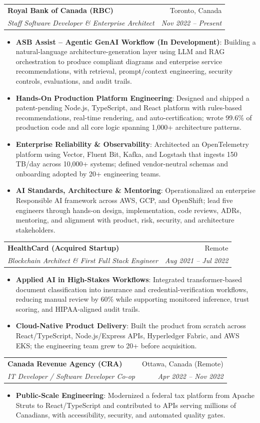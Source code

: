 \documentclass[letterpaper,9.5pt]{article}
\makeatletter
\newcommand{\resumeItem}[2]{\item\small{\textbf{#1}{: #2 \vspace{-2pt}}}}
\newcommand{\resumeSubheading}[4]{\vspace{-2pt}\item\begin{tabular*}{0.97\textwidth}{l@{\extracolsep{\fill}}r}\textbf{#1} & #2 \\\textit{\small#3} & \textit{\small #4} \\\end{tabular*}\vspace{-6pt}}
\newcommand{\resumeItemListStart}{\begin{itemize}}
\newcommand{\resumeItemListEnd}{\end{itemize}\vspace{-6pt}}
\makeatother
\begin{document}
  \resumeSubheading
    {Royal Bank of Canada (RBC)}{Toronto, Canada}
    {Staff Software Developer \& Enterprise Architect}{Nov 2022 -- Present}
  \resumeItemListStart
    \resumeItem{ASB Assist -- Agentic GenAI Workflow (In Development)}
      {Building a natural-language architecture-generation layer using LLM and RAG orchestration to produce compliant diagrams and enterprise service recommendations, with retrieval, prompt/context engineering, security controls, evaluations, and audit trails.}
    \resumeItem{Hands-On Production Platform Engineering}
      {Designed and shipped a patent-pending Node.js, TypeScript, and React platform with rules-based recommendations, real-time rendering, and auto-certification; wrote 99.6\% of production code and all core logic spanning 1,000+ architecture patterns.}
    \resumeItem{Enterprise Reliability \& Observability}
      {Architected an OpenTelemetry platform using Vector, Fluent Bit, Kafka, and Logstash that ingests 150\,TB/day across 10,000+ systems; defined vendor-neutral schemas and onboarding adopted by 20+ engineering teams.}
    \resumeItem{AI Standards, Architecture \& Mentoring}
      {Operationalized an enterprise Responsible AI framework across AWS, GCP, and OpenShift; lead five engineers through hands-on design, implementation, code reviews, ADRs, mentoring, and alignment with product, risk, security, and architecture stakeholders.}
  \resumeItemListEnd

  \resumeSubheading
    {HealthCard (Acquired Startup)}{Remote}
    {Blockchain Architect \& First Full Stack Engineer}{Aug 2021 -- Jul 2022}
  \resumeItemListStart
    \resumeItem{Applied AI in High-Stakes Workflows}
      {Integrated transformer-based document classification into insurance and credential-verification workflows, reducing manual review by 60\% while supporting monitored inference, trust scoring, and HIPAA-aligned audit trails.}
    \resumeItem{Cloud-Native Product Delivery}
      {Built the product from scratch across React/TypeScript, Node.js/Express APIs, Hyperledger Fabric, and AWS EKS; the engineering team grew to 20+ before acquisition.}
  \resumeItemListEnd

  \resumeSubheading
    {Canada Revenue Agency (CRA)}{Ottawa, Canada (Remote)}
    {IT Developer / Software Developer Co-op}{Apr 2022 -- Nov 2022}
  \resumeItemListStart
    \resumeItem{Public-Scale Engineering}
      {Modernized a federal tax platform from Apache Struts to React/TypeScript and contributed to APIs serving millions of Canadians, with accessibility, security, and automated quality gates.}
  \resumeItemListEnd
\end{document}
